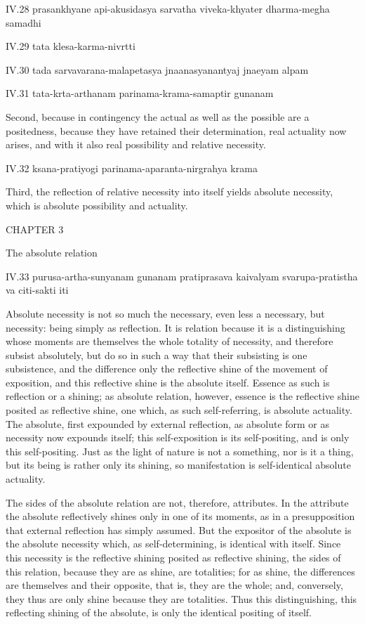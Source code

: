 IV.28
prasankhyane api-akusidasya sarvatha viveka-khyater dharma-megha samadhi

IV.29
tata klesa-karma-nivrtti

IV.30
tada sarvavarana-malapetasya jnaanasyanantyaj jnaeyam alpam

IV.31
tata-krta-arthanam parinama-krama-samaptir gunanam

Second, because in contingency
the actual as well as the possible
are a positedness,
because they have retained their determination,
real actuality now arises,
and with it also real possibility
and relative necessity.

IV.32
ksana-pratiyogi parinama-aparanta-nirgrahya krama

Third, the reflection of relative necessity
into itself yields absolute necessity,
which is absolute possibility and actuality.

CHAPTER 3

The absolute relation

IV.33
purusa-artha-sunyanam gunanam pratiprasava kaivalyam
svarupa-pratistha va citi-sakti iti

Absolute necessity is not so much the necessary,
even less a necessary, but necessity:
being simply as reflection.
It is relation
because it is a distinguishing
whose moments are themselves
the whole totality of necessity,
and therefore subsist absolutely,
but do so in such a way that
their subsisting is one subsistence,
and the difference only the reflective shine of
the movement of exposition,
and this reflective shine is the absolute itself.
Essence as such is reflection or a shining;
as absolute relation, however, essence is the
reflective shine posited as reflective shine,
one which, as such self-referring, is absolute actuality.
The absolute, first expounded by external reflection,
as absolute form or as necessity now expounds itself;
this self-exposition is its self-positing,
and is only this self-positing.
Just as the light of nature is not a something,
nor is it a thing, but its being is rather only its shining,
so manifestation is self-identical absolute actuality.

The sides of the absolute relation are not, therefore, attributes.
In the attribute the absolute reflectively shines only in one of its moments,
as in a presupposition that external reflection has simply assumed.
But the expositor of the absolute is the absolute necessity
which, as self-determining, is identical with itself.
Since this necessity is the reflective shining
posited as reflective shining, the sides of this relation,
because they are as shine, are totalities;
for as shine, the differences are themselves and their opposite,
that is, they are the whole;
and, conversely, they thus are only shine because they are totalities.
Thus this distinguishing, this reflecting shining of the absolute,
is only the identical positing of itself.

